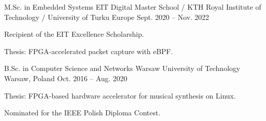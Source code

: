 
\begin{cventries}

  \cventry
    {M.Sc. in Embedded Systems}
    {EIT Digital Master School / KTH Royal Institute of Technology / University of Turku}
    {Europe}
    {Sept. 2020 -- Nov. 2022}
    {
      \begin{cvitems}
        \item {Recipient of the EIT Excellence Scholarship.}
        \item {Thesis: FPGA-accelerated packet capture with eBPF.}
      \end{cvitems}
    }

  \cventry
    {B.Sc. in Computer Science and Networks}
    {Warsaw University of Technology}
    {Warsaw, Poland}
    {Oct. 2016 -- Aug. 2020}
    {
      \begin{cvitems}
        \item {Thesis: FPGA-based hardware accelerator for musical synthesis on Linux.}
        \item {Nominated for the IEEE Polish Diploma Contest.}
      \end{cvitems}
    }

\end{cventries}
